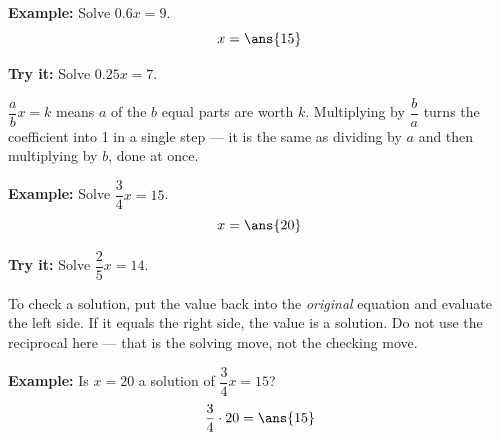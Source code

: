 \documentclass[12pt]{article}
\begin{document}
\begin{examplebox}
\textbf{Example:} Solve $0.6x = 9$.
\[ x = \ans{15} \]
\end{examplebox}

\begin{tryitbox}
\textbf{Try it:} Solve $0.25x = 7$.\\[2pt]
\end{tryitbox}


\begin{formulabox}
$\dfrac{a}{b}x = k$ means $a$ of the $b$ equal parts are worth $k$. Multiplying
by $\dfrac{b}{a}$ turns the coefficient into 1 in a single step --- it is the
same as dividing by $a$ and then multiplying by $b$, done at once.
\end{formulabox}

\begin{examplebox}
\textbf{Example:} Solve $\dfrac{3}{4}x = 15$.
\[ x = \ans{20} \]
\end{examplebox}

\begin{tryitbox}
\textbf{Try it:} Solve $\dfrac{2}{5}x = 14$.\\[2pt]
\end{tryitbox}


\begin{formulabox}
To check a solution, put the value back into the \emph{original} equation and
evaluate the left side. If it equals the right side, the value is a solution. Do
not use the reciprocal here --- that is the solving move, not the checking move.
\end{formulabox}

\begin{examplebox}
\textbf{Example:} Is $x = 20$ a solution of $\dfrac{3}{4}x = 15$?
\[ \dfrac{3}{4}\cdot 20 = \ans{15} \]
\end{examplebox}
\end{document}
